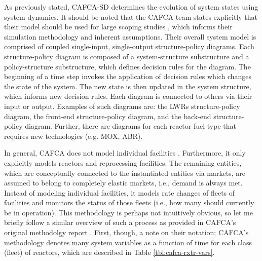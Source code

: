 As previously stated, CAFCA-SD determines the evolution of system states using
system dynamics. It should be noted that the CAFCA team states explicitly that
their model should be used for large scoping studies \cite{guerin_impact_2009},
which informs their simulation methodology and inherent assumptions. Their
overall system model is comprised of coupled single-input, single-output
structure-policy diagrams. Each structure-policy diagram is composed of a
system-structure substructure and a policy-structure substructure, which defines
decision rules for the diagram. The beginning of a time step invokes the
application of decision rules which changes the state of the system. The new
state is then updated in the system structure, which informs new decision
rules. Each diagram is connected to others via their input or output. Examples
of such diagrams are: the LWRs structure-policy diagram, the front-end
structure-policy diagram, and the back-end structure-policy diagram. Further,
there are diagrams for each reactor fuel type that requires new technologies
(e.g. MOX, ABR).

In general, CAFCA does not model individual
facilities \cite{guerin_impact_2009}. Furthermore, it only explicitly models
reactors and reprocessing facilities. The remaining entities, which are
conceptually connected to the instantiated entities via markets, are assumed to
belong to completely elastic markets, i.e., demand is always met. Instead of
modeling individual facilities, it models rate changes of fleets of facilities
and monitors the status of those fleets (i.e., how many should currently be in
operation). This methodology is perhaps not intuitively obvious, so let me
briefly follow a similar overview of such a process as provided in CAFCA's
original methodolgy report \cite{busquim_e_silva_system_2008}. First, though, a
note on their notation; CAFCA's methodology denotes many system variables as a
function of time for each class (fleet) of reactors, which are described in
Table \ref{tbl:cafca-rxtr-vars}.

